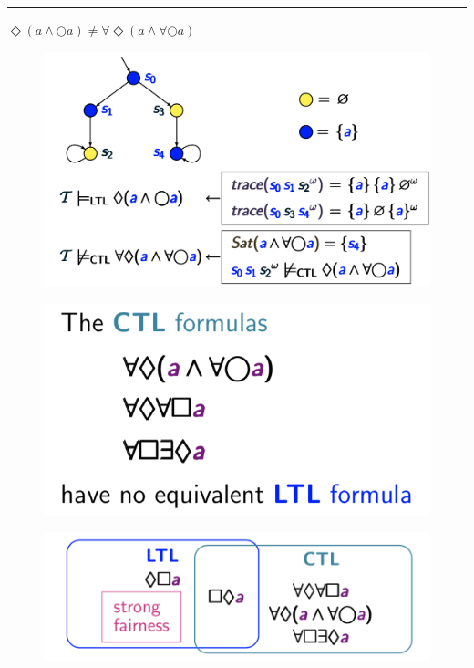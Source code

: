 \documentclass[a4paper, notitlepage, 9pt]{extreport}
\begin{document}
\hrule
\begin{multicols}{2}
	\noindent
	$\Diamond (a \land \bigcirc a) \neq \forall \Diamond (a \land \forall \bigcirc a)$
	\begin{figure}[H]
		\centering
		\includegraphics[scale=0.13]{vs2}
	\end{figure}
\columnbreak
\begin{figure}[H]
	\centering
	\includegraphics[scale=0.3]{v3}
\end{figure}
\begin{figure}[H]
	\centering
	\includegraphics[scale=0.27]{v4}
\end{figure}
\end{multicols}
\end{document}
